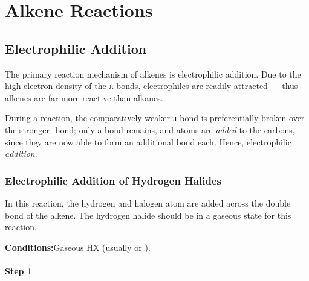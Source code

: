 



	\pagebreak
	\section{Alkene Reactions}

	\subsection{Electrophilic Addition}

		The primary reaction mechanism of alkenes is electrophilic addition. Due to the high electron density of the π-bonds,
		electrophiles are readily attracted –– thus alkenes are far more reactive than alkanes.

		During a reaction, the comparatively weaker π-bond is preferentially broken over the stronger \chemsigma-bond; only a
		 bond remains, and atoms are \textit{added} to the carbons, since they are now able to form an additional
		bond each. Hence, electrophilic \textit{addition}.

		\subsubsection{Electrophilic Addition of Hydrogen Halides}

			In this reaction, the hydrogen and halogen atom are added across the double bond of the alkene. The hydrogen halide
			should be in a gaseous state for this reaction.

			\vspace{1.5em}
			\vbox{\textbf{Conditions:}\tabto{35mm}Gaseous HX (usually  or ).}

			\paragraph{Step 1}

